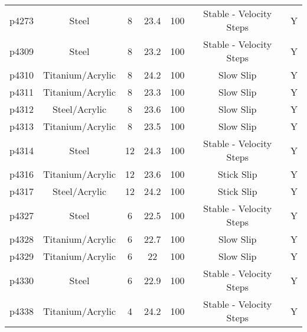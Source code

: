 \documentclass[11pt]{article}
\begin{document}
\begin{center}
\begin{sidewaystable}
\begin{tabular}{ | c c c c c c c | }
p4273      & Steel            & 8                   & 23.4            & 100                   & Stable - Velocity Steps         & Y              \\
p4309      & Steel            & 8                   & 23.2            & 100                   & Stable - Velocity Steps         & Y              \\
p4310      & Titanium/Acrylic & 8                   & 24.2            & 100                   & Slow Slip                       & Y              \\
p4311      & Titanium/Acrylic & 8                   & 23.3            & 100                   & Slow Slip                       & Y              \\
p4312      & Steel/Acrylic    & 8                   & 23.6            & 100                   & Slow Slip                       & Y              \\
p4313      & Titanium/Acrylic & 8                   & 23.5            & 100                   & Slow Slip                       & Y              \\
p4314      & Steel            & 12                  & 24.3            & 100                   & Stable - Velocity Steps         & Y              \\
p4316      & Titanium/Acrylic & 12                  & 23.6            & 100                   & Stick Slip                      & Y              \\
p4317      & Steel/Acrylic    & 12                  & 24.2            & 100                   & Stick Slip                      & Y              \\
p4327      & Steel            & 6                   & 22.5            & 100                   & Stable - Velocity Steps         & Y              \\
p4328      & Titanium/Acrylic & 6                   & 22.7            & 100                   & Slow Slip                       & Y              \\
p4329      & Titanium/Acrylic & 6                   & 22              & 100                   & Slow Slip                       & Y              \\
p4330      & Steel            & 6                   & 22.9            & 100                   & Stable - Velocity Steps         & Y              \\
p4338      & Titanium/Acrylic & 4                   & 24.2            & 100                   & Stable - Velocity Steps         & Y              \\

\end{tabular}
\end{sidewaystable}
\end{center}
\end{document}
